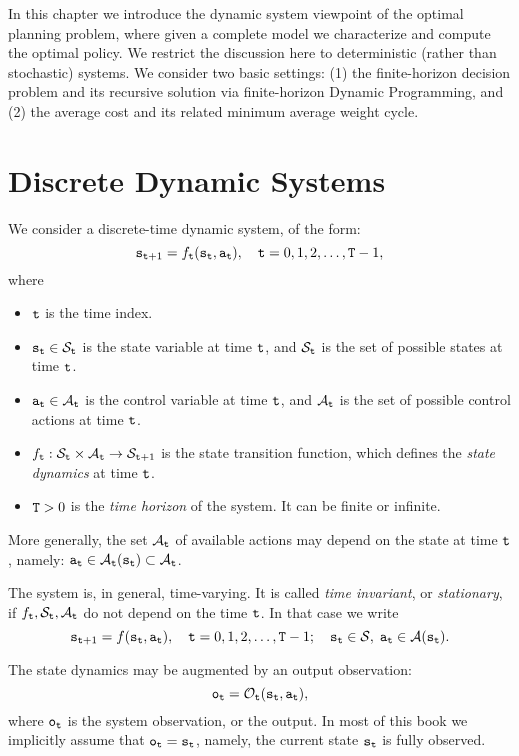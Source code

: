 

In this chapter we introduce the dynamic system viewpoint of the
optimal planning problem, where given a complete model we characterize and compute the optimal policy. We restrict the discussion here to
deterministic (rather than stochastic) systems. We consider two
basic settings: (1) the finite-horizon decision problem and its
recursive solution via finite-horizon Dynamic Programming, and (2) the
average cost and its related minimum average weight cycle.

\section{Discrete Dynamic Systems}
We consider a discrete-time dynamic system, of the form:
\[{{\tt s}_{{\tt t} + 1}} = {f_{{\tt t}}}({{\tt s}_{{\tt t}}},{{\tt a}_{{\tt t}}}),\quad {\tt t} = 0,1,2, \ldots ,{\tt T} - 1, \]
where
\begin{itemize}
  \item ${\tt t}$ is the time index.
  \item ${{\tt s}_{{\tt t}}} \in {\mathcal{S}_{{\tt t}}}$ is the state variable at time ${\tt t}$, and $\mathcal{S}_{{\tt t}}$ is the set of possible states at time
  ${\tt t}$.
  \item ${{\tt a}_{{\tt t}}} \in {\mathcal{A}_{{\tt t}}}$  is the control variable at time ${\tt t}$, and $\mathcal{A}_{{\tt t}}$ is the set of possible control actions at time
  ${\tt t}$.
  \item ${f_{{\tt t}}}:{\mathcal{S}_{{\tt t}}} \times {\mathcal{A}_{{\tt t}}} \to {\mathcal{S}_{{\tt t}+ 1}}$ is the state transition function, which defines the \emph{state dynamics} at time
  ${\tt t}$.
  \item ${\tt T}>0$ is the \emph{time horizon} of the system.  It can be finite or infinite.
\end{itemize}

\begin{remark}
    More generally, the set $\mathcal{A}_{{\tt t}}$ of available actions may depend on the state at time ${\tt t}$, namely: ${\tt a}_{{\tt t}} \in {\mathcal{A}_{{\tt t}}}({{\tt s}_{{\tt t}}}) \subset
    {\mathcal{A}_{{\tt t}}}$.
\end{remark}
\begin{remark}
The system is, in general, time-varying. It is called \emph{time
invariant}, or \emph{stationary}, if ${f_{{\tt t}}},{\mathcal{S}_{{\tt t}}},{\mathcal{A}_{{\tt t}}}$
do not depend on the time ${\tt t}$. In that case we
    write
\[{{\tt s}_{{\tt t} + 1}} = f({{\tt s}_{{\tt t}}},{{\tt a}_{{\tt t}}}),\quad {\tt t} = 0,1,2, \ldots ,{\tt T} - 1;\quad {{\tt s}_{{\tt t}}} \in \mathcal{S},\;{{\tt a}_{{\tt t}}} \in
\mathcal{A}({{\tt s}_{{\tt t}}}).\]
\end{remark}
\begin{remark}
    The state dynamics may be augmented by an output observation:
\[{{\tt o}_{{\tt t}}} = {\mathcal{O}_{{\tt t}}}({{\tt s}_{{\tt t}}},{{\tt a}_{{\tt t}}}),\]
where  ${\tt o}_{{\tt t}}$ is the system observation, or the
output. In most of this book we  implicitly assume that
${\tt o}_{{\tt t}}={\tt s}_{{\tt t}}$, namely, the current state
${\tt s}_{{\tt t}}$ is fully observed.
\end{remark}

